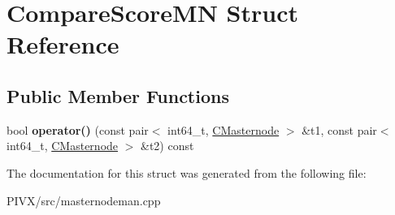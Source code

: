\hypertarget{struct_compare_score_m_n}{}\section{Compare\+Score\+MN Struct Reference}
\label{struct_compare_score_m_n}
\subsection*{Public Member Functions}
\begin{DoxyCompactItemize}
\item 
\mbox{\label{struct_compare_score_m_n_a889b0ab67f4f82eed053e58cebb9dae2}} 
bool {\bfseries operator()} (const pair$<$ int64\+\_\+t, \mbox{\hyperlink{class_c_masternode}{C\+Masternode}} $>$ \&t1, const pair$<$ int64\+\_\+t, \mbox{\hyperlink{class_c_masternode}{C\+Masternode}} $>$ \&t2) const
\end{DoxyCompactItemize}


The documentation for this struct was generated from the following file\+:\begin{DoxyCompactItemize}
\item 
P\+I\+V\+X/src/masternodeman.\+cpp\end{DoxyCompactItemize}
